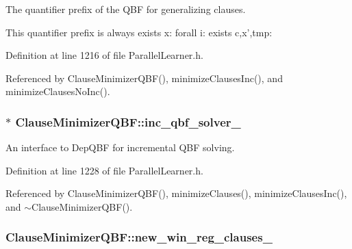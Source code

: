 The quantifier prefix of the Q\-B\-F for generalizing clauses. 

This quantifier prefix is always exists x\-: forall i\-: exists c,x',tmp\-: 

Definition at line 1216 of file Parallel\-Learner.\-h.



Referenced by Clause\-Minimizer\-Q\-B\-F(), minimize\-Clauses\-Inc(), and minimize\-Clauses\-No\-Inc().

\hypertarget{classClauseMinimizerQBF_aacc48a267e9a25a81b2a851f297a7ec1}{
\subsubsection[{inc\-\_\-qbf\-\_\-solver\-\_\-}]{$\ast$ Clause\-Minimizer\-Q\-B\-F\-::inc\-\_\-qbf\-\_\-solver\-\_\-\hspace{0.3cm}{\ttfamily [protected]}}}\label{classClauseMinimizerQBF_aacc48a267e9a25a81b2a851f297a7ec1}


An interface to Dep\-Q\-B\-F for incremental Q\-B\-F solving. 



Definition at line 1228 of file Parallel\-Learner.\-h.



Referenced by Clause\-Minimizer\-Q\-B\-F(), minimize\-Clauses(), minimize\-Clauses\-Inc(), and $\sim$\-Clause\-Minimizer\-Q\-B\-F().

\hypertarget{classClauseMinimizerQBF_abe2ed21eb5d92ef978ad6aa83ed8af7e}{
\subsubsection[{new\-\_\-win\-\_\-reg\-\_\-clauses\-\_\-}]{ Clause\-Minimizer\-Q\-B\-F\-::new\-\_\-win\-\_\-reg\-\_\-clauses\-\_\-\hspace{0.3cm}{\ttfamily [protected]}}}\label{classClauseMinimizerQBF_abe2ed21eb5d92ef978ad6aa83ed8af7e}


